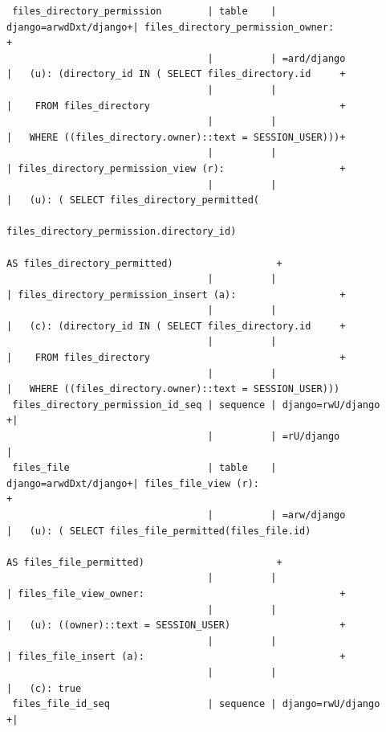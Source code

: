 \documentclass[12pt]{report}
\begin{document}
\begin{landscape}
{\begin{verbatim}
 files_directory_permission        | table    | django=arwdDxt/django+| files_directory_permission_owner:                       +
                                   |          | =ard/django           |   (u): (directory_id IN ( SELECT files_directory.id     +
                                   |          |                       |    FROM files_directory                                 +
                                   |          |                       |   WHERE ((files_directory.owner)::text = SESSION_USER)))+
                                   |          |                       | files_directory_permission_view (r):                    +
                                   |          |                       |   (u): ( SELECT files_directory_permitted(
                                                                                 files_directory_permission.directory_id)
                                                                                 AS files_directory_permitted)                  +
                                   |          |                       | files_directory_permission_insert (a):                  +
                                   |          |                       |   (c): (directory_id IN ( SELECT files_directory.id     +
                                   |          |                       |    FROM files_directory                                 +
                                   |          |                       |   WHERE ((files_directory.owner)::text = SESSION_USER)))
 files_directory_permission_id_seq | sequence | django=rwU/django    +|
                                   |          | =rU/django            |
 files_file                        | table    | django=arwdDxt/django+| files_file_view (r):                                    +
                                   |          | =arw/django           |   (u): ( SELECT files_file_permitted(files_file.id)
                                                                                 AS files_file_permitted)                       +
                                   |          |                       | files_file_view_owner:                                  +
                                   |          |                       |   (u): ((owner)::text = SESSION_USER)                   +
                                   |          |                       | files_file_insert (a):                                  +
                                   |          |                       |   (c): true
 files_file_id_seq                 | sequence | django=rwU/django    +|

\end{verbatim}}
\end{landscape}
\end{document}
